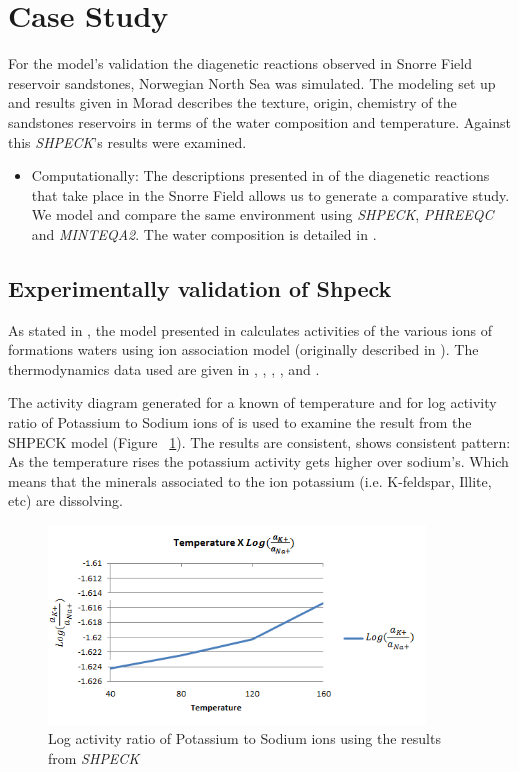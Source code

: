 \section{Case Study}
For the model’s validation the diagenetic reactions observed in Snorre Field reservoir sandstones, Norwegian North Sea was simulated. The modeling set up and results given in Morad \cite{Morad:90} describes the texture, origin, chemistry of the sandstones reservoirs in terms of the water composition and temperature. Against this \emph{SHPECK}'s results were examined.
\begin{itemize}
\item Computationally: The descriptions presented in \cite{Morad:90} of the diagenetic reactions that take place in the Snorre Field allows us to generate a comparative study. We model and compare the same environment using \emph{SHPECK}, \emph{PHREEQC} and \emph{MINTEQA2}. The water composition is detailed in \cite{Nordstrom:79}.
\end{itemize}


\subsection{Experimentally validation of Shpeck}
As stated in \cite{Morad:90}, the model presented in \cite{Egeberg:88} calculates activities of the various ions of formations waters using ion association model (originally described in \cite{Wigley:77}). 
The thermodynamics data used are given in \cite{Helgeson:74a},  \cite{Helgeson:74b}, \cite{Helgeson:76}, \cite{Waltter:77}, \cite{Helgeson:78} and \cite{Helgeson:81}.

The activity diagram generated for a known of temperature and for log activity ratio of Potassium to Sodium ions of \cite{Aagaard:90} is used to examine the result from the SHPECK model (Figure ~\ref{fig:tempXactratio}). The results are consistent, shows consistent pattern: As the temperature rises the potassium activity gets higher over sodium's. Which means that the minerals associated to the ion potassium (i.e. K-feldspar, Illite, etc) are dissolving.


\begin{figure}[ht!]
\centering
\includegraphics[width=100mm]{figures/tempXactratio.png}
\caption{Log activity ratio of Potassium to Sodium ions using the results from \emph{SHPECK}}
\label{fig:tempXactratio}
\end{figure}

